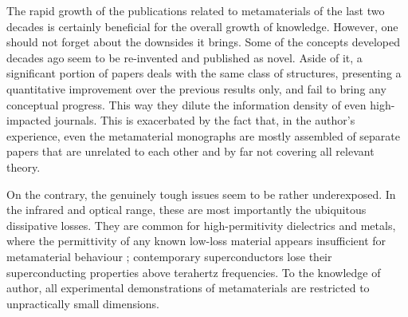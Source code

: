 The rapid growth of the publications related to metamaterials of the last two decades is certainly beneficial for the overall growth of knowledge. However, one should not forget about the downsides it brings. Some of the concepts developed decades ago seem to be re-invented and published as novel. Aside of it, a significant portion of papers deals with the same class of structures, presenting a quantitative improvement over the previous results only, and fail to bring any conceptual progress. This way they dilute the information density of even high-impacted journals. This is exacerbated by the fact that, in the author's experience, even the metamaterial monographs are mostly assembled of separate papers that are unrelated to each other and by far not covering all relevant theory.

On the contrary, the genuinely tough issues seem to be rather underexposed. In the infrared and optical range, these are most importantly the ubiquitous dissipative losses. They are common for high-permitivity dielectrics and metals, where the permittivity of any known low-loss material appears insufficient for metamaterial behaviour \cite{dominec2014transition}; contemporary superconductors lose their superconducting properties above terahertz frequencies. To the knowledge of author, all experimental demonstrations of metamaterials are restricted to unpractically small dimensions. 

